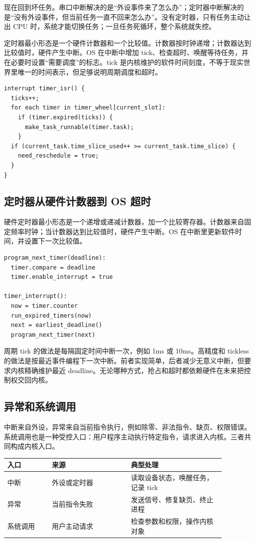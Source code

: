 现在回到坏任务。串口中断解决的是“外设事件来了怎么办”；定时器中断解决的是“没有外设事件，但当前任务一直不回来怎么办”。没有定时器，只有任务主动让出 CPU 时，系统才能切换任务；一旦任务死循环，整个系统就失控。

定时器最小形态是一个硬件计数器和一个比较值。计数器按时钟递增；计数器达到比较值时，硬件产生中断。OS 在中断中增加 tick、检查超时、唤醒等待任务，并在必要时设置“需要调度”的标志。tick 是内核维护的软件时间刻度，不等于现实世界里唯一的时间表示，但足够说明周期调度和超时。

\begin{lstlisting}
interrupt timer_isr() {
  ticks++;
  for each timer in timer_wheel[current_slot]:
    if (timer.expired(ticks)) {
      make_task_runnable(timer.task);
    }
  if (current_task.time_slice_used++ >= current_task.time_slice) {
    need_reschedule = true;
  }
}
\end{lstlisting}

\subsection{定时器从硬件计数器到 OS 超时}

硬件定时器最小形态是一个递增或递减计数器，加一个比较寄存器。计数器来自固定频率时钟；当计数器达到比较值时，硬件产生中断。OS 在中断里更新软件时间，并设置下一次比较值。

\begin{lstlisting}
program_next_timer(deadline):
  timer.compare = deadline
  timer.enable_interrupt = true

timer_interrupt():
  now = timer.counter
  run_expired_timers(now)
  next = earliest_deadline()
  program_next_timer(next)
\end{lstlisting}

周期 tick 的做法是每隔固定时间中断一次，例如 1ms 或 10ms。高精度和 tickless 的做法是按最近事件编程下一次中断。前者实现简单，后者减少无意义中断，但要求内核精确维护最近 deadline。无论哪种方式，抢占和超时都依赖硬件在未来把控制权交回内核。

\subsection{异常和系统调用}

中断来自外设，异常来自当前指令执行，例如除零、非法指令、缺页、权限错误。系统调用也是一种受控入口：用户程序主动执行特定指令，请求进入内核。三者共同构成内核入口。

\begin{longtable}{p{0.18\linewidth}p{0.32\linewidth}p{0.38\linewidth}}
\toprule
入口 & 来源 & 典型处理 \\
\midrule
中断 & 外设或定时器 & 读取设备状态，唤醒任务，记录 tick \\
异常 & 当前指令失败 & 发送信号、修复缺页、终止进程 \\
系统调用 & 用户主动请求 & 检查参数和权限，操作内核对象 \\
\bottomrule
\end{longtable}

